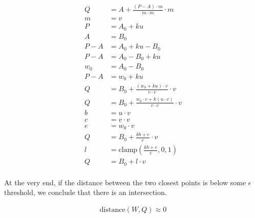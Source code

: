 \documentclass{article}
\begin{document}
\begin{align*}
    Q &= A + \frac{(P - A) \cdot m}{m \cdot m} \cdot m \\
    m &= v \\
    P &= A_0 + ku \\
    A &= B_0 \\
    P - A &= A_0 + ku - B_0 \\
    P - A &= A_0 - B_0 + ku \\
    w_0 &= A_0 - B_0 \\
    P - A &= w_0 + ku \\
    Q &= B_0 + \frac{(w_0 + ku) \cdot v}{v \cdot v} \cdot v \\
    Q &= B_0 + \frac{w_0 \cdot v + k (u \cdot v)}{v \cdot v} \cdot v \\
    b &= u \cdot v \\
    c &= v \cdot v \\
    e &= w_0 \cdot v \\
    Q &= B_0 + \frac{kb + e}{c} \cdot v \\
    l &= \text{clamp}(\frac{kb + e}{c}, 0, 1) \\
    Q &= B_0 + l \cdot v \\
\end{align*}

At the very end, if the distance between the two closest points is below some $\epsilon$ threshold, we conclude that there is an intersection.

\begin{align*}
    \text{distance}(W, Q) \approx 0
\end{align*}
\end{document}
